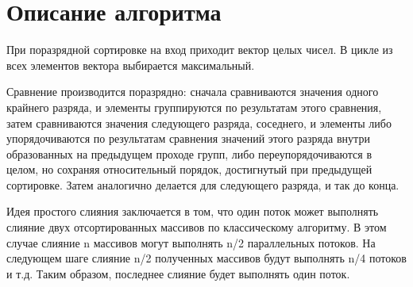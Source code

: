 \documentclass{report}
\begin{document}
	\section*{Описание алгоритма}
	При поразрядной сортировке на вход приходит вектор целых чисел. В цикле из всех элементов вектора выбирается максимальный.
	\par Сравнение производится поразрядно: сначала сравниваются значения одного крайнего разряда, и элементы группируются по результатам этого сравнения, затем сравниваются значения следующего разряда, соседнего, и элементы либо упорядочиваются по результатам сравнения значений этого разряда внутри образованных на предыдущем проходе групп, либо переупорядочиваются в целом, но сохраняя относительный порядок, достигнутый при предыдущей сортировке. Затем аналогично делается для следующего разряда, и так до конца.
	\par Идея простого слияния заключается в том, что один поток может выполнять слияние двух отсортированных массивов по классическому алгоритму. В этом случае слияние n массивов могут выполнять n/2 параллельных потоков. На следующем шаге слияние n/2 полученных массивов будут выполнять n/4 потоков и т.д. Таким образом, последнее слияние будет выполнять один поток.
	\newpage
	
\end{document}
